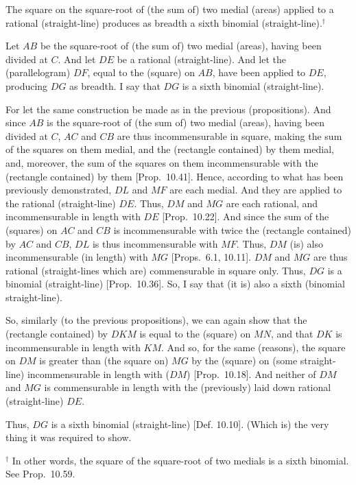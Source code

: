 \begin{Parallel}{}{}
{The square on the square-root of (the sum of) two medial
(areas) applied to a rational (straight-line) produces as breadth  a sixth binomial (straight-line).$^\dag$

Let $AB$ be the square-root of (the sum of) two medial (areas), having been divided
at $C$. And let $DE$ be a  rational (straight-line). And let the (parallelogram) $DF$, equal to the (square) on $AB$, have been applied to $DE$, producing $DG$
as breadth. I say that $DG$ is a sixth binomial (straight-line).

\epsfysize=1.6in 
\centerline{}

For  let the same construction  be made  as in the previous (propositions). And since $AB$ is the square-root of (the sum of) two medial
(areas), having been divided at $C$, $AC$ and $CB$ are thus incommensurable
in square, making the sum of the squares on them medial, and the (rectangle
contained) by them medial, and, moreover, the sum of the squares on them
incommensurable with the (rectangle contained) by them [Prop.~10.41]. Hence, according to
what has been previously  demonstrated, $DL$ and $MF$ are each medial.
And they are applied to the rational (straight-line) $DE$. Thus, $DM$ and
$MG$ are each rational, and incommensurable in length with $DE$ [Prop.~10.22]. And since the sum of the (squares)
on $AC$ and $CB$ is incommensurable with twice the (rectangle contained)
by $AC$ and $CB$, $DL$ is thus incommensurable with $MF$. Thus,
$DM$ (is) also incommensurable (in length) with $MG$
[Props.~6.1, 10.11]. 
$DM$ and $MG$ are thus rational (straight-lines which are) commensurable
in square only. Thus, $DG$ is a binomial (straight-line) [Prop.~10.36]. So, I say that (it is) also a sixth
(binomial straight-line).

So, similarly (to the previous propositions), we can again show that the (rectangle contained) by $DKM$ is equal to the (square) on $MN$, and that
$DK$ is incommensurable in length with $KM$. And so, for the same (reasons), the square on $DM$ is greater than (the square on) $MG$ by the
(square) on (some straight-line) incommensurable in length with ($DM$) [Prop.~10.18]. And neither of $DM$ and $MG$
is commensurable in length with the (previously) laid down rational (straight-line) $DE$.

Thus, $DG$ is a sixth binomial (straight-line) [Def. 10.10]. (Which is) the very thing it
was required to show.}
\end{Parallel}
{\footnotesize\noindent $^\dag$ In other words, the square of the square-root of  two  medials  is a
sixth binomial. See Prop.~10.59.}


